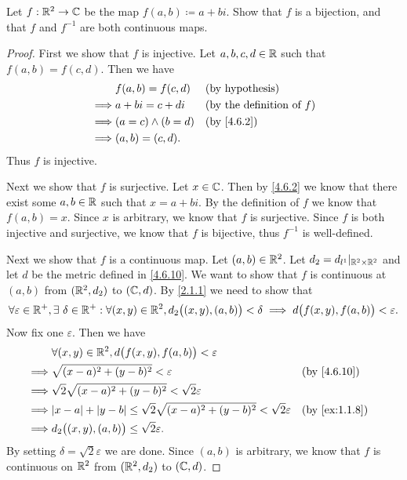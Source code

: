 \begin{ex}\label{ex:4.6.11}
  Let \(f : \mathbb{R}^2 \to \mathbb{C}\) be the map \(f(a, b) \coloneqq a + bi\).
  Show that \(f\) is a bijection, and that \(f\) and \(f^{-1}\) are both continuous maps.
\end{ex}

\begin{proof}
  First we show that \(f\) is injective.
  Let \(a, b, c, d \in \mathbb{R}\) such that \(f(a, b) = f(c, d)\).
  Then we have
  \begin{align*}
             & f(a, b) = f(c, d)     &  & \text{(by hypothesis)}              \\
    \implies & a + bi = c + di       &  & \text{(by the definition of \(f\))} \\
    \implies & (a = c) \land (b = d) &  & \text{(by \cref{4.6.2})}            \\
    \implies & (a, b) = (c, d).
  \end{align*}
  Thus \(f\) is injective.

  Next we show that \(f\) is surjective.
  Let \(x \in \mathbb{C}\).
  Then by \cref{4.6.2} we know that there exist some \(a, b \in \mathbb{R}\) such that \(x = a + bi\).
  By the definition of \(f\) we know that \(f(a, b) = x\).
  Since \(x\) is arbitrary, we know that \(f\) is surjective.
  Since \(f\) is both injective and surjective, we know that \(f\) is bijective, thus \(f^{-1}\) is well-defined.

  Next we show that \(f\) is a continuous map.
  Let \((a, b) \in \mathbb{R}^2\).
  Let \(d_2 = d_{l^1}|_{\mathbb{R}^2 \times \mathbb{R}^2}\) and let \(d\) be the metric defined in \cref{4.6.10}.
  We want to show that \(f\) is continuous at \((a, b)\) from \((\mathbb{R}^2, d_2)\) to \((\mathbb{C}, d)\).
  By \cref{2.1.1} we need to show that
  \[
    \forall \varepsilon \in \mathbb{R}^+, \exists\ \delta \in \mathbb{R}^+ : \forall (x, y) \in \mathbb{R}^2, d_2\big((x, y), (a, b)\big) < \delta \implies d\big(f(x, y), f(a, b)\big) < \varepsilon.
  \]
  Now fix one \(\varepsilon\).
  Then we have
  \begin{align*}
             & \forall (x, y) \in \R^2, d\big(f(x, y), f(a, b)\big) < \varepsilon                                                           \\
    \implies & \sqrt{(x - a)^2 + (y - b)^2} < \varepsilon                                                  &  & \text{(by \cref{4.6.10})}   \\
    \implies & \sqrt{2} \sqrt{(x - a)^2 + (y - b)^2} < \sqrt{2} \varepsilon                                                                 \\
    \implies & \abs{x - a} + \abs{y - b} \leq \sqrt{2} \sqrt{(x - a)^2 + (y - b)^2} < \sqrt{2} \varepsilon &  & \text{(by \cref{ex:1.1.8})} \\
    \implies & d_2\big((x, y), (a, b)\big) \leq \sqrt{2} \varepsilon.
  \end{align*}
  By setting \(\delta = \sqrt{2} \varepsilon\) we are done.
  Since \((a, b)\) is arbitrary, we know that \(f\) is continuous on \(\mathbb{R}^2\) from \((\mathbb{R}^2, d_2)\) to \((\mathbb{C}, d)\).


\end{proof}
